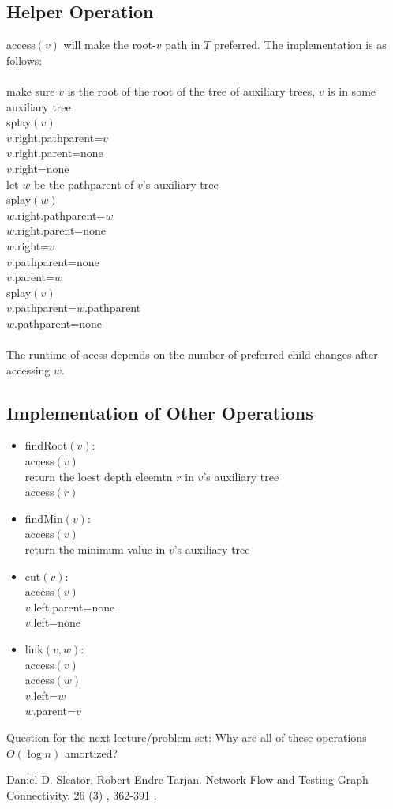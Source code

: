 \documentclass[11pt]{article}
\begin{document}
\subsection{Helper Operation}
access$(v)$ will make the root-$v$ path in $T$ preferred. The implementation is as follows:
\\
\\
make sure $v$ is the root of the root of the tree of auxiliary trees, $v$ is in some auxiliary tree
\\
splay$(v)$
\\
$v$.right.pathparent=$v$
\\
$v$.right.parent=none
\\
$v$.right=none
\\
let $w$ be the pathparent of $v$'s auxiliary tree
\\
splay$(w)$
\\
$w$.right.pathparent=$w$
\\
$w$.right.parent=none
\\
$w$.right=$v$
\\
$v$.pathparent=none
\\
$v$.parent=$w$
\\
splay$(v)$
\\
$v$.pathparent=$w$.pathparent
\\
$w$.pathparent=none
\\
\\
The runtime of acess depends on the number of preferred child changes after accessing $w$.


\subsection{Implementation of Other Operations}
\begin{itemize}
\item findRoot$(v)$:
\\ access$(v)$
\\ return the loest depth eleemtn $r$ in $v$'s auxiliary tree
\\  access$(r)$
\item findMin$(v)$:
\\ access$(v)$
\\ return the minimum value in $v$'s auxiliary tree
\item cut$(v)$:
\\ access$(v)$
\\ $v$.left.parent=none
\\ $v$.left=none
\item link$(v,w)$:
\\ access$(v)$
\\ access$(w)$
\\ $v$.left=$w$
\\ $w$.parent=$v$
\end{itemize}
Question for the next lecture/problem set: Why are all of these operations $O(\log n)$ amortized?



\begin{thebibliography}{42}

Daniel D. Sleator, Robert Endre Tarjan.
\newblock Network Flow and Testing Graph Connectivity.
 26 (3) , 362-391 .
\end{thebibliography}
\end{document}
